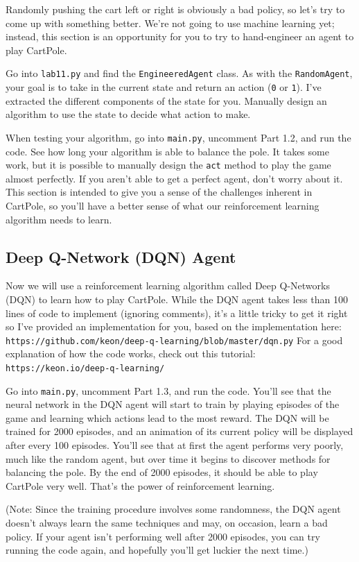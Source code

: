 \documentclass{article}
\begin{document}
Randomly pushing the cart left or right is obviously a bad policy, so let's try to come up with something better. We're not going to use machine learning yet; instead, this section is an opportunity for you to try to hand-engineer an agent to play CartPole.

Go into \texttt{lab11.py} and find the \texttt{EngineeredAgent} class. As with the \texttt{RandomAgent}, your goal is to take in the current state and return an action (\texttt{0} or \texttt{1}). I've extracted the different components of the state for you. Manually design an algorithm to use the state to decide what action to make.

When testing your algorithm, go into \texttt{main.py}, uncomment Part 1.2, and run the code. See how long your algorithm is able to balance the pole. It takes some work, but it is possible to manually design the \texttt{act} method to play the game almost perfectly. If you aren't able to get a perfect agent, don't worry about it. This section is intended to give you a sense of the challenges inherent in CartPole, so you'll have a better sense of what our reinforcement learning algorithm needs to learn.

\subsection{Deep Q-Network (DQN) Agent}

Now we will use a reinforcement learning algorithm called Deep Q-Networks (DQN) to learn how to play CartPole. While the DQN agent takes less than 100 lines of code to implement (ignoring comments), it's a little tricky to get it right so I've provided an implementation for you, based on the implementation here: \texttt{https://github.com/keon/deep-q-learning/blob/master/dqn.py} For a good explanation of how the code works, check out this tutorial: \texttt{https://keon.io/deep-q-learning/}

Go into \texttt{main.py}, uncomment Part 1.3, and run the code. You'll see that the neural network in the DQN agent will start to train by playing episodes of the game and learning which actions lead to the most reward. The DQN will be trained for 2000 episodes, and an animation of its current policy will be displayed after every 100 episodes. You'll see that at first the agent performs very poorly, much like the random agent, but over time it begins to discover methods for balancing the pole. By the end of 2000 episodes, it should be able to play CartPole very well. That's the power of reinforcement learning.

(Note: Since the training procedure involves some randomness, the DQN agent doesn't always learn the same techniques and may, on occasion, learn a bad policy. If your agent isn't performing well after 2000 episodes, you can try running the code again, and hopefully you'll get luckier the next time.)
\end{document}

